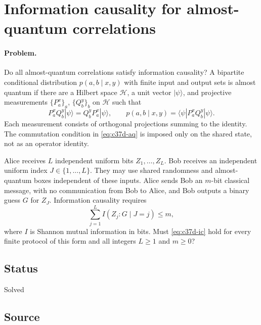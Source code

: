 \section{Information causality for almost-quantum correlations}
\label{sec:op_c37d38eda1436c12}

\paragraph{Problem.}
Do all almost-quantum correlations satisfy information causality?
A bipartite conditional distribution $p(a,b\mid x,y)$ with finite input and
output sets is almost quantum if there are a Hilbert space $\mathcal H$,
a unit vector $|\psi\rangle$, and projective measurements
$\{P_a^x\}_a$, $\{Q_b^y\}_b$ on $\mathcal H$ such that
\begin{equation}
  P_a^x Q_b^y|\psi\rangle=Q_b^y P_a^x|\psi\rangle,
  \qquad p(a,b\mid x,y)=\langle\psi|P_a^x Q_b^y|\psi\rangle.
  \label{eq:c37d-aq}
\end{equation}
Each measurement consists of orthogonal projections summing to the identity.
The commutation condition in \eqref{eq:c37d-aq} is imposed only on the shared
state, not as an operator identity.

Alice receives $L$ independent uniform bits $Z_1,\ldots,Z_L$.
Bob receives an independent uniform index $J\in\{1,\ldots,L\}$.
They may use shared randomness and almost-quantum boxes independent of these
inputs.
Alice sends Bob an $m$-bit classical message, with no communication
from Bob to Alice, and Bob outputs a binary guess $G$ for $Z_J$.
Information causality requires
\begin{equation}
  \sum_{j=1}^{L} I(Z_j:G\mid J=j)\leq m,
  \label{eq:c37d-ic}
\end{equation}
where $I$ is Shannon mutual information in bits.
Must \eqref{eq:c37d-ic} hold for every finite protocol of this form and all
integers $L\geq1$ and $m\geq0$?

\subsection*{Status}

Solved

\subsection*{Source}

